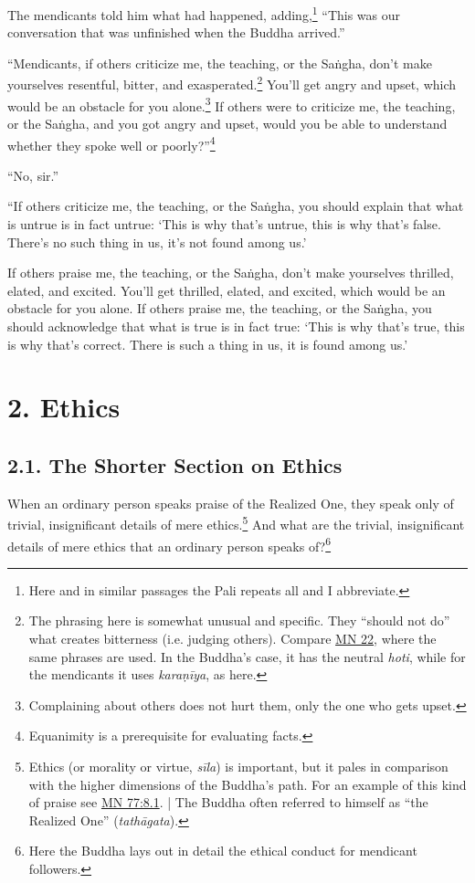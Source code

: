\documentclass[12pt,openany]{book}%
\begin{document}
The mendicants told him what had happened, adding,\footnote{Here and in similar passages the Pali repeats all and I abbreviate. } “This was our conversation that was unfinished when the Buddha arrived.” 

“Mendicants, if others criticize me, the teaching, or the \textsanskrit{Saṅgha}, don’t make yourselves resentful, bitter, and exasperated.\footnote{The phrasing here is somewhat unusual and specific. They “should not do” what creates bitterness (i.e. judging others). Compare \href{https://suttacentral.net/mn22/en/sujato}{MN 22}, where the same phrases are used. In the Buddha’s case, it has the neutral \textit{hoti}, while for the mendicants it uses \textit{\textsanskrit{karaṇīya}}, as here. } You’ll get angry and upset, which would be an obstacle for you alone.\footnote{Complaining about others does not hurt them, only the one who gets upset. } If others were to criticize me, the teaching, or the \textsanskrit{Saṅgha}, and you got angry and upset, would you be able to understand whether they spoke well or poorly?”\footnote{Equanimity is a prerequisite for evaluating facts. } 

“No, sir.” 

“If others criticize me, the teaching, or the \textsanskrit{Saṅgha}, you should explain that what is untrue is in fact untrue: ‘This is why that’s untrue, this is why that’s false. There’s no such thing in us, it’s not found among us.’ 

If others praise me, the teaching, or the \textsanskrit{Saṅgha}, don’t make yourselves thrilled, elated, and excited. You’ll get thrilled, elated, and excited, which would be an obstacle for you alone. If others praise me, the teaching, or the \textsanskrit{Saṅgha}, you should acknowledge that what is true is in fact true: ‘This is why that’s true, this is why that’s correct. There is such a thing in us, it is found among us.’ 

\section*{2. Ethics }

\subsection*{2.1. The Shorter Section on Ethics }

When an ordinary person speaks praise of the Realized One, they speak only of trivial, insignificant details of mere ethics.\footnote{Ethics (or morality or virtue, \textit{\textsanskrit{sīla}}) is important, but it pales in comparison with the higher dimensions of the Buddha’s path. For an example of this kind of praise see \href{https://suttacentral.net/mn77/en/sujato\#8.1}{MN 77:8.1}. | The Buddha often referred to himself as “the Realized One” (\textit{\textsanskrit{tathāgata}}). } And what are the trivial, insignificant details of mere ethics that an ordinary person speaks of?\footnote{Here the Buddha lays out in detail the ethical conduct for mendicant followers. } 
\end{document}
